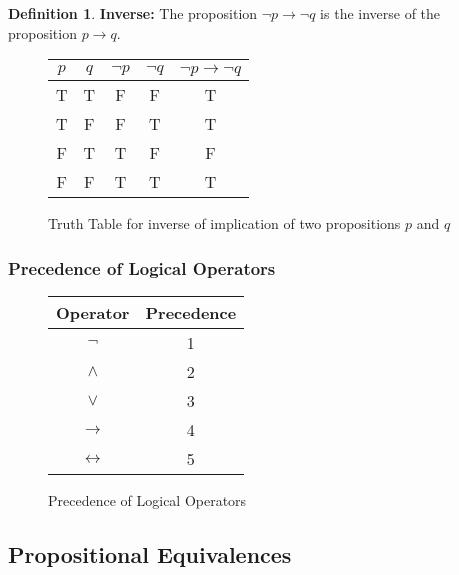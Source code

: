 \documentclass[article, 11pt]{article}
\theoremstyle{definition}
\newtheorem{definition}{Definition}[section]
\newcommand{\lra}{\leftrightarrow} %
\begin{document}
    \begin{definition}
        \textbf{Inverse:} The proposition $\neg p \to \neg q$ is the inverse of the proposition $p \to q$.    
    \end{definition}
    \begin{figure}[H]
        \centering
            \begin{tabular}{c|c|c|c|c}
                $p$ & $q$ & $\neg{p}$ & $\neg{q}$ & $\neg p \to \neg q$ \\
                \hline
                T & T & F & F & T \\
                T & F & F & T & T \\
                F & T & T & F & F \\
                F & F & T & T & T
            \end{tabular}    
        \caption{Truth Table for inverse of implication of two propositions $p$ and $q$}
    \end{figure}
    \subsubsection{Precedence of Logical Operators}
    \begin{figure}[H]
        \centering
        \begin{tabular}{|c|c|}
            \hline
            Operator & Precedence \\
            \hline
            $\neg$ & 1 \\
            $\land$ & 2 \\
            $\lor$ & 3 \\
            $\to$ & 4 \\
            $\lra$ & 5 \\
            \hline        
        \end{tabular}
        \caption{Precedence of Logical Operators}
    \end{figure}
    \subsection{Propositional Equivalences}
\end{document}
